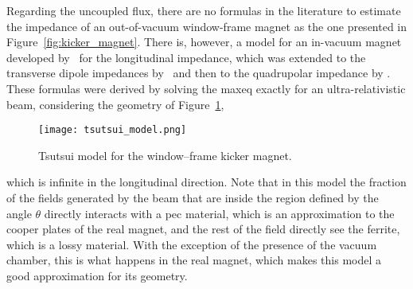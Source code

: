     Regarding the uncoupled flux, there are no formulas in the literature to estimate the impedance of an out-of-vacuum window-frame magnet as the one presented in Figure~\ref{fig:kicker_magnet}. There is, however, a model for an in-vacuum magnet developed by~ for the longitudinal impedance, which was extended to the transverse dipole impedances by~ and then to the quadrupolar impedance by . These formulas were derived by solving the \gls{maxeq} exactly for an ultra-relativistic beam, considering the geometry of Figure~\ref{fig:tsutsui_model},
    \begin{figure}[b!]
        \centering
        \texttt{[image: tsutsui\_model.png]}
        \caption{Tsutsui model for the window--frame kicker magnet.}
        \label{fig:tsutsui_model}
    \end{figure}
    which is infinite in the longitudinal direction. Note that in this model the fraction of the fields generated by the beam that are inside the region defined by the angle $\theta$ directly interacts with a \gls{pec} material, which is an approximation to the cooper plates of the real magnet, and the rest of the field  directly see the ferrite, which is a lossy material. With the exception of the presence of the vacuum chamber, this is what happens in the real magnet, which makes this model a good approximation for its geometry.

